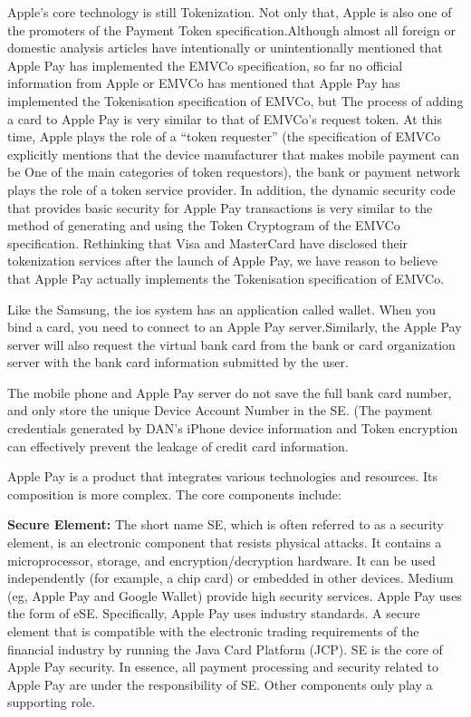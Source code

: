 \documentclass[journal]{IEEEtran}
\begin{document}
Apple's core technology is still Tokenization. Not only that, Apple is also one of the promoters of the Payment Token specification.Although almost all foreign or domestic analysis articles have intentionally or unintentionally mentioned that Apple Pay has implemented the EMVCo specification, so far no official information from Apple or EMVCo has mentioned that Apple Pay has implemented the Tokenisation specification of EMVCo, but The process of adding a card to Apple Pay is very similar to that of EMVCo's request token. At this time, Apple plays the role of a “token requester” (the specification of EMVCo explicitly mentions that the device manufacturer that makes mobile payment can be One of the main categories of token requestors), the bank or payment network plays the role of a token service provider. In addition, the dynamic security code that provides basic security for Apple Pay transactions is very similar to the method of generating and using the Token Cryptogram of the EMVCo specification. Rethinking that Visa and MasterCard have disclosed their tokenization services after the launch of Apple Pay, we have reason to believe that Apple Pay actually implements the Tokenisation specification of EMVCo.

Like the Samsung, the ios system has an application called wallet. When you bind a card, you need to connect to an Apple Pay server.Similarly, the Apple Pay server will also request the virtual bank card from the bank or card organization server with the bank card information submitted by the user.

The mobile phone and Apple Pay server do not save the full bank card number, and only store the unique Device Account Number in the SE. (The payment credentials generated by DAN's iPhone device information and Token encryption can effectively prevent the leakage of credit card information.

Apple Pay is a product that integrates various technologies and resources. Its composition is more complex. The core components include:



\textbf{Secure Element:} The short name SE, which is often referred to as a security element, is an electronic component that resists physical attacks. It contains a microprocessor, storage, and encryption/decryption hardware. It can be used independently (for example, a chip card) or embedded in other devices. Medium (eg, Apple Pay and Google Wallet) provide high security services. Apple Pay uses the form of eSE. Specifically, Apple Pay uses industry standards. A secure element that is compatible with the electronic trading requirements of the financial industry by running the Java Card Platform (JCP). SE is the core of Apple Pay security. In essence, all payment processing and security related to Apple Pay are under the responsibility of SE. Other components only play a supporting role.
\end{document}

